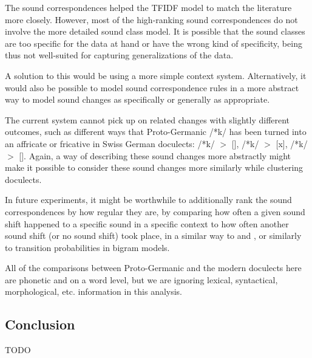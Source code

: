 \documentclass[a4paper]{article}
\begin{document}
The sound correspondences helped the TFIDF model
to match the literature more closely.
However, most of the high-ranking sound correspondences
do not involve the more detailed sound class model.
It is possible that the sound classes are too specific
for the data at hand or have the wrong kind of specificity,
being thus not well-suited for capturing generalizations of the data.

A solution to this would be using a more simple context system.
Alternatively, it would also be possible to model sound correspondence
rules in a more abstract way to model sound changes
as specifically or generally as appropriate.


The current system cannot pick up on related changes
with slightly different outcomes, such as different
ways that Proto-Germanic /*k/ has been turned into
an affricate or fricative in Swiss German doculects:
/*k/ $>$ [], /*k/ $>$ [x], /*k/ $>$ [\textchi].
Again, a way of describing these sound changes more abstractly
might make it possible to consider these sound changes more
similarly while clustering doculects.

In future experiments, it might be worthwhile to additionally rank
the sound correspondences by how regular they are,
by comparing how often a given sound shift happened
to a specific sound in a specific context
to how often another sound shift (or no sound shift) took place,
in a similar way to \citet{prokic2007identifying} and \citet{prokic2013combining},
or similarly to transition probabilities in bigram models.

All of the comparisons between Proto-Germanic and the modern doculects
here are phonetic
and on a word level, but we are ignoring
lexical, syntactical, morphological, etc. information in this analysis.

\subsection{Conclusion} %

TODO



\end{document}
